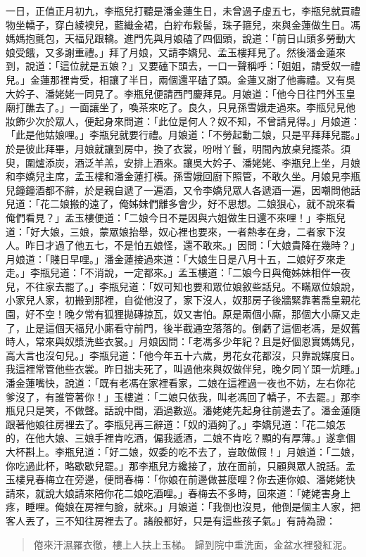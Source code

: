 一日，正值正月初九，李瓶兒打聽是潘金蓮生日，未曾過子虛五七，李瓶兒就買禮物坐轎子，穿白綾襖兒，藍織金裙，白紵布鬏髻，珠子箍兒，來與金蓮做生日。馮媽媽抱氈包，天福兒跟轎。進門先與月娘磕了四個頭，說道：「前日山頭多勞動大娘受餓，又多謝重禮。」拜了月娘，又請李嬌兒、孟玉樓拜見了。然後潘金蓮來到，說道：「這位就是五娘？」又要磕下頭去，一口一聲稱呼：「姐姐，請受奴一禮兒。」金蓮那裡肯受，相讓了半日，兩個還平磕了頭。金蓮又謝了他壽禮。又有吳大妗子、潘姥姥一同見了。李瓶兒便請西門慶拜見。月娘道：「他今日往門外玉皇廟打醮去了。」一面讓坐了，喚茶來吃了。良久，只見孫雪娥走過來。李瓶兒見他妝飾少次於眾人，便起身來問道：「此位是何人？奴不知，不曾請見得。」月娘道：「此是他姑娘哩。」李瓶兒就要行禮。月娘道：「不勞起動二娘，只是平拜拜兒罷。」於是彼此拜畢，月娘就讓到房中，換了衣裳，吩咐丫鬟，明間內放桌兒擺茶。須臾，圍爐添炭，酒泛羊羔，安排上酒來。讓吳大妗子、潘姥姥、李瓶兒上坐，月娘和李嬌兒主席，孟玉樓和潘金蓮打橫。孫雪娥回廚下照管，不敢久坐。月娘見李瓶兒鐘鐘酒都不辭，於是親自遞了一遍酒，又令李嬌兒眾人各遞酒一遍，因嘲問他話兒道：「花二娘搬的遠了，俺姊妹們離多會少，好不思想。二娘狠心，就不說來看俺們看見？」孟玉樓便道：「二娘今日不是因與六姐做生日還不來哩！」李瓶兒道：「好大娘，三娘，蒙眾娘抬舉，奴心裡也要來，一者熱孝在身，二者家下沒人。昨日才過了他五七，不是怕五娘怪，還不敢來。」因問：「大娘貴降在幾時？」月娘道：「賤日早哩。」潘金蓮接過來道：「大娘生日是八月十五，二娘好歹來走走。」李瓶兒道：「不消說，一定都來。」孟玉樓道：「二娘今日與俺姊妹相伴一夜兒，不往家去罷了。」李瓶兒道：「奴可知也要和眾位娘敘些話兒。不瞞眾位娘說，小家兒人家，初搬到那裡，自從他沒了，家下沒人，奴那房子後牆緊靠著喬皇親花園，好不空！晚夕常有狐狸拋磚掠瓦，奴又害怕。原是兩個小廝，那個大小廝又走了，止是這個天福兒小廝看守前門，後半截通空落落的。倒虧了這個老馮，是奴舊時人，常來與奴漿洗些衣裳。」月娘因問：「老馮多少年紀？且是好個恩實媽媽兒，高大言也沒句兒。」李瓶兒道：「他今年五十六歲，男花女花都沒，只靠說媒度日。我這裡常管他些衣裳。昨日拙夫死了，叫過他來與奴做伴兒，晚夕同丫頭一炕睡。」潘金蓮嘴快，說道：「既有老馮在家裡看家，二娘在這裡過一夜也不妨，左右你花爹沒了，有誰管著你！」玉樓道：「二娘只依我，叫老馮回了轎子，不去罷。」那李瓶兒只是笑，不做聲。話說中間，酒過數巡。潘姥姥先起身往前邊去了。潘金蓮隨跟著他娘往房裡去了。李瓶兒再三辭道：「奴的酒夠了。」李嬌兒道：「花二娘怎的，在他大娘、三娘手裡肯吃酒，偏我遞酒，二娘不肯吃？顯的有厚薄。」遂拿個大杯斟上。李瓶兒道：「好二娘，奴委的吃不去了，豈敢做假！」月娘道：「二娘，你吃過此杯，略歇歇兒罷。」那李瓶兒方纔接了，放在面前，只顧與眾人說話。孟玉樓見春梅立在旁邊，便問春梅：「你娘在前邊做甚麼哩？你去連你娘、潘姥姥快請來，就說大娘請來陪你花二娘吃酒哩。」春梅去不多時，回來道：「姥姥害身上疼，睡哩。俺娘在房裡勻臉，就來。」月娘道：「我倒也沒見，他倒是個主人家，把客人丟了，三不知往房裡去了。諸般都好，只是有這些孩子氣。」有詩為證：
\begin{quote}
倦來汗濕羅衣徹，樓上人扶上玉梯。
歸到院中重洗面，金盆水裡發紅泥。
\end{quote}

